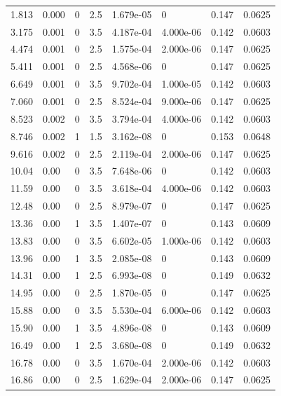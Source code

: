 \documentclass[preview]{standalone}
\begin{document}
{{\begin{tabular}{L{1.2cm}C{1.2cm} C{0.3cm}C{0.5cm} C{1.4cm}C{1.4cm} C{1.4cm}C{1.4cm}}
  1.813  &  0.000  & 0     & 2.5 &  1.679e-05  & 0  & 0.147 &  0.0625   \\ 
  3.175  &  0.001  & 0     & 3.5 &  4.187e-04  & 4.000e-06  & 0.142 &  0.0603   \\ 
  4.474  &  0.001  & 0     & 2.5 &  1.575e-04  & 2.000e-06  & 0.147 &  0.0625   \\ 
  5.411  &  0.001  & 0     & 2.5 &  4.568e-06  & 0  & 0.147 &  0.0625   \\ 
  6.649  &  0.001  & 0     & 3.5 &  9.702e-04  & 1.000e-05  & 0.142 &  0.0603   \\ 
  7.060  &  0.001  & 0     & 2.5 &  8.524e-04  & 9.000e-06  & 0.147 &  0.0625   \\ 
  8.523  &  0.002  & 0     & 3.5 &  3.794e-04  & 4.000e-06  & 0.142 &  0.0603   \\ 
  8.746  &  0.002  & 1     & 1.5 &  3.162e-08  & 0  & 0.153 &  0.0648   \\ 
  9.616  &  0.002  & 0     & 2.5 &  2.119e-04  & 2.000e-06  & 0.147 &  0.0625   \\ 
  10.04  &  0.00  & 0     & 3.5 &  7.648e-06  & 0  & 0.142 &  0.0603   \\ 
  11.59  &  0.00  & 0     & 3.5 &  3.618e-04  & 4.000e-06  & 0.142 &  0.0603   \\ 
  12.48  &  0.00  & 0     & 2.5 &  8.979e-07  & 0  & 0.147 &  0.0625   \\ 
  13.36  &  0.00  & 1     & 3.5 &  1.407e-07  & 0  & 0.143 &  0.0609   \\ 
  13.83  &  0.00  & 0     & 3.5 &  6.602e-05  & 1.000e-06  & 0.142 &  0.0603   \\ 
  13.96  &  0.00  & 1     & 3.5 &  2.085e-08  & 0  & 0.143 &  0.0609   \\ 
  14.31  &  0.00  & 1     & 2.5 &  6.993e-08  & 0  & 0.149 &  0.0632   \\ 
  14.95  &  0.00  & 0     & 2.5 &  1.870e-05  & 0  & 0.147 &  0.0625   \\ 
  15.88  &  0.00  & 0     & 3.5 &  5.530e-04  & 6.000e-06  & 0.142 &  0.0603   \\ 
  15.90  &  0.00  & 1     & 3.5 &  4.896e-08  & 0  & 0.143 &  0.0609   \\ 
  16.49  &  0.00  & 1     & 2.5 &  3.680e-08  & 0  & 0.149 &  0.0632   \\ 
  16.78  &  0.00  & 0     & 3.5 &  1.670e-04  & 2.000e-06  & 0.142 &  0.0603   \\ 
  16.86  &  0.00  & 0     & 2.5 &  1.629e-04  & 2.000e-06  & 0.147 &  0.0625   \\ 

\end{tabular}}}
\end{document}
